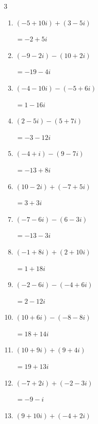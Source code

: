 \begin{multicols}{3}
\begin{enumerate}
        $\displaystyle =-18-15i$

  \item $\displaystyle (-5+10i) + (3-5i)$

        $\displaystyle =-2+5i$

  \item $\displaystyle (-9-2i) - (10+2i)$

        $\displaystyle =-19-4i$

  \item $\displaystyle (-4-10i) - (-5+6i)$

        $\displaystyle =1-16i$

\columnbreak %

\resetques

  \item $\displaystyle (2-5i) - (5+7i)$

        $\displaystyle =-3-12i$

  \item $\displaystyle (-4+i) - (9-7i)$

        $\displaystyle =-13+8i$

  \item $\displaystyle (10-2i) + (-7+5i)$

        $\displaystyle =3+3i$

  \item $\displaystyle (-7-6i) - (6-3i)$

        $\displaystyle =-13-3i$

  \item $\displaystyle (-1+8i) + (2+10i)$

        $\displaystyle =1+18i$

  \item $\displaystyle (-2-6i) - (-4+6i)$

        $\displaystyle =2-12i$

  \item $\displaystyle (10+6i) - (-8-8i)$

        $\displaystyle =18+14i$

  \item $\displaystyle (10+9i) + (9+4i)$

        $\displaystyle =19+13i$

  \item $\displaystyle (-7+2i) + (-2-3i)$

        $\displaystyle =-9-i$

  \item $\displaystyle (9+10i) + (-4+2i)$


\end{enumerate}
\end{multicols}
